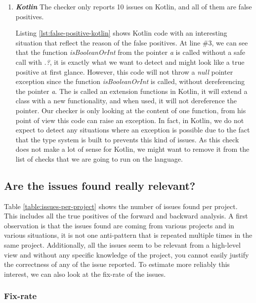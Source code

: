 \begin{enumerate}
	\item \textbf{\textit{Kotlin}}
	The checker only reports 10 issues on Kotlin, and all of them are false positives.
	
	
	
	Listing \ref{lst:false-positive-kotlin} shows Kotlin code with an interesting situation that reflect the reason of the false positives. 
	At line $\#3$, we can see that the function \emph{isBooleanOrInt} from the pointer \emph{a} is called without a safe call with \emph{.?}, it is exactly what we want to detect and might look like a true positive at first glance. 
	However, this code will not throw a \emph{null} pointer exception since the function \emph{isBooleanOrInt} is called, without dereferencing the pointer \emph{a}.
	The is called an extension functions \cite{kotlinExtensionFun:2019:Online} in Kotlin, it will extend a class with a new functionality, and when used, it will not dereference the pointer.
	Our checker is only looking at the content of one function, from his point of view this code can raise an exception.
	In fact, in Kotlin, we do not expect to detect any situations where an exception is possible due to the fact that the type system is built to prevents this kind of issues.
	As this check does not make a lot of sense for Kotlin, we might want to remove it from the list of checks that we are going to run on the language.
\end{enumerate}

\subsection{Are the issues found really relevant?}
\label{subsec:are_the_issues_relevant}

Table \ref{table:issues-per-project} shows the number of issues found per project. 
This includes all the true positives of the forward and backward analysis. 
A first observation is that the issues found are coming from various projects and in various situations, it is not one anti-pattern that is repeated multiple times in the same project. 
Additionally, all the issues seem to be relevant from a high-level view and without any specific knowledge of the project, you cannot easily justify the correctness of any of the issue reported.
To estimate more reliably this interest, we can also look at the fix-rate of the issues.

\subsubsection{Fix-rate}
\label{subsubsec:fix_rate}


